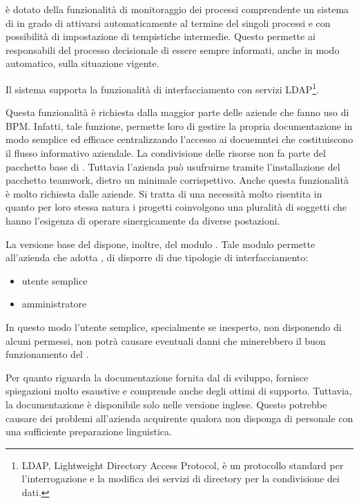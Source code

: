 \progname è dotato della funzionalità di monitoraggio dei processi comprendente un sistema di  in grado di attivarsi automaticamente al termine del singoli processi e con possibilità di impostazione di tempistiche intermedie. Questo permette ai responsabili del processo decisionale di essere sempre informati, anche in modo automatico, sulla situazione vigente.

Il sistema supporta la funzionalità di interfacciamento con servizi LDAP\footnote{LDAP,  Lightweight Directory Access Protocol, è un protocollo standard per l'interrogazione e la modifica dei servizi di directory per la condivisione dei dati.\label{note:ldap}}. 

Questa funzionalità è richiesta dalla maggior parte delle aziende che fanno uso di \sw BPM. Infatti, tale funzione, permette loro di gestire la propria documentazione in modo semplice ed efficace centralizzando l'accesso ai docuemntei che costituiscono il flusso informativo aziendale.
La condivisione delle risorse non fa parte del pacchetto base di \progname. 
Tuttavia l'azienda può usufruirne tramite l'installazione del pacchetto \textsf{teamwork}, dietro un minimale corrispettivo.
Anche questa funzionalità è molto richiesta dalle aziende. Si tratta di una necessità molto risentita in quanto per loro stessa natura i progetti coinvolgono una pluralità di soggetti che hanno l'esigenza di  operare sinergicamente da diverse postazioni.

La versione base del \sw dispone, inoltre, del modulo . Tale modulo permette all'azienda che adotta , di disporre di due tipologie di interfacciamento:
\begin{itemize}
 \item utente semplice
 \item amministratore
\end{itemize}

In questo modo l'utente semplice, specialmente se inesperto, non disponendo di alcuni permessi, non potrà causare eventuali danni che minerebbero il buon funzionamento del \sw.

Per quanto riguarda la documentazione fornita dal  di sviluppo, fornisce spiegazioni molto esaustive e comprende anche degli ottimi  di supporto. 
Tuttavia, la documentazione è disponibile solo nelle versione inglese. Questo potrebbe causare dei problemi all'azienda acquirente qualora non disponga di personale con una sufficiente preparazione linguistica.

